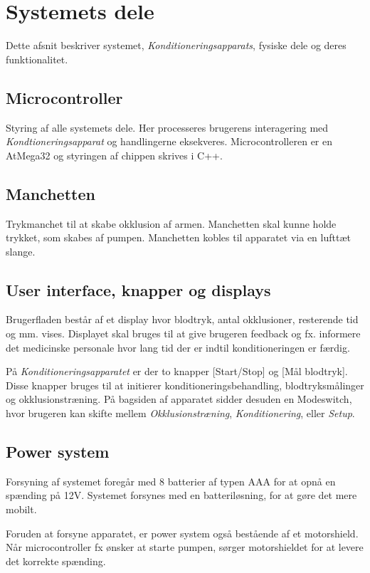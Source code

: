 \chapter{Systemets dele} \label{title:systemPart}
Dette afsnit beskriver systemet, \textit{Konditioneringsapparats}, fysiske dele og deres funktionalitet.

\section{Microcontroller}
Styring af alle systemets dele. Her processeres brugerens interagering med \textit{Kondtioneringsapparat} og handlingerne eksekveres. Microcontrolleren er en AtMega32 og styringen af chippen skrives i C++.

\section{Manchetten}
Trykmanchet til at skabe okklusion af armen. Manchetten skal kunne holde trykket, som skabes af pumpen. Manchetten kobles til apparatet via en lufttæt slange. 

\section{User interface, knapper og displays}
Brugerfladen består af et display hvor blodtryk, antal okklusioner, resterende tid og mm. vises. Displayet skal bruges til at give brugeren feedback og fx. informere det medicinske personale hvor lang tid der er indtil konditioneringen er færdig. 

På \textit{Konditioneringsapparatet} er der to knapper [Start/Stop] og [Mål blodtryk]. Disse knapper bruges til at initierer konditioneringsbehandling, blodtryksmålinger og okklusionstræning. På bagsiden af apparatet sidder desuden en Modeswitch, hvor brugeren kan skifte mellem \textit{Okklusionstræning}, \textit{Konditionering}, eller \textit{Setup}. 

\section{Power system}
Forsyning af systemet foregår med 8 batterier af typen AAA for at opnå en spænding på 12V. Systemet forsynes med en batteriløsning, for at gøre det mere mobilt.  

Foruden at forsyne apparatet, er power system også bestående af et motorshield. Når microcontroller fx ønsker at starte pumpen, sørger motorshieldet for at levere det korrekte spænding. 

